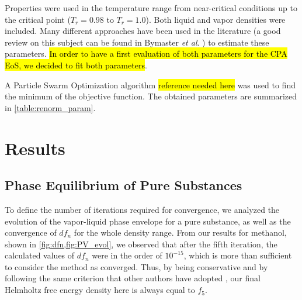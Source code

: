 \documentclass[preprint,12pt,3p]{elsarticle}
\begin{document}
Properties were used in the temperature range from near-critical conditions up to the critical point ($T_r=0.98$ to $T_r=1.0$).
Both liquid and vapor densities were included.
Many different approaches have been used in the literature (a good review on this subject can be found in Bymaster \textit{et al}. \cite{bymaster2008renormalization}) to estimate these parameters.
\hl{In order to have a first evaluation of both parameters for the CPA EoS, we decided to fit both parameters}.

A Particle Swarm Optimization algorithm \hl{reference needed here} was used to find the minimum of the objective function.
The obtained parameters are summarized in \cref{table:renorm_param}.

\begin{table}[ht!]
	\centering
	\caption{Renormalization method parameters estimated using the procedure described in \cref{sec:Parameter Estimation}.}
	\label{table:renorm_param}
\end{table}

\section{Results}

\subsection{Phase Equilibrium of Pure Substances}
\label{sec:pure-substance phase equilibrium results}

To define the number of iterations required for convergence, we analyzed the evolution of the vapor-liquid phase envelope for a pure substance, as well as the convergence of $df_{n}$ for the whole density range.
From our results for methanol, shown in \cref{fig:dfn,fig:PV_evol}, we observed that after the fifth iteration, the calculated values of $df_{n}$ were in the order of $10^{-15}$, which is more than sufficient to consider the method as converged.
Thus, by being conservative and by following the same criterion that other authors have adopted \cite{llovell2004thermodynamic, cai2004thermodynamics, pcm2017application}, our final Helmholtz free energy density here is always equal to $f_{5}$.
\end{document}
